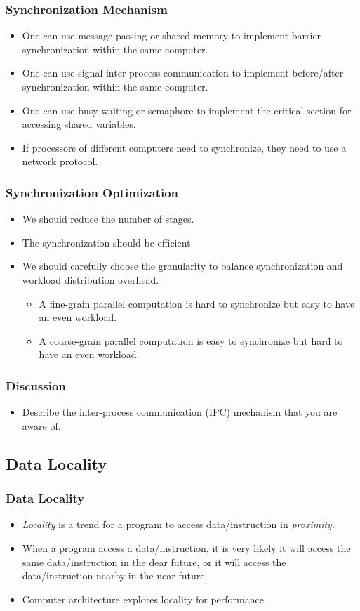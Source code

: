 \documentclass{beamer}
\begin{document}
\begin{CJK}{UTF8}{bsmi}
\begin{frame}
\frametitle{Synchronization Mechanism}
\begin{itemize}
\item One can use message passing or shared memory to implement
  barrier synchronization within the same computer.
\item One can use signal inter-process communication to implement
  before/after synchronization within the same computer. 
\item One can use busy waiting or semaphore to implement the critical
  section for accessing shared variables.
\item If processors of different computers need to synchronize, they need to use a network protocol.
\end{itemize}
\end{frame}


\begin{frame}
\frametitle{Synchronization Optimization}
\begin{itemize}
\item We should reduce the number of stages.
\item The synchronization should be efficient.
\item We should carefully choose the granularity to balance synchronization and workload distribution overhead.
\begin{itemize}
\item A fine-grain parallel computation is hard to synchronize but easy to have an even workload.
\item A coarse-grain parallel computation is easy to synchronize but hard to have an even workload.
\end{itemize}
\end{itemize}
\end{frame}

\begin{frame}
\frametitle{Discussion}
\begin{itemize}
\item Describe the inter-process communication (IPC) mechanism that
  you are aware of.
\end{itemize}
\end{frame}


\subsection{Data Locality}

\begin{frame}
\frametitle{Data Locality}
\begin{itemize}
\item {\em Locality} is a trend for a program to access
  data/instruction in {\em proximity}.
\item When a program access a data/instruction, it is very likely it
  will access the same data/instruction in the dear future, or it will
  access the data/instruction nearby in the near future.
\item Computer architecture explores locality for performance.
\end{itemize}
\end{frame}


\end{CJK}
\end{document}
